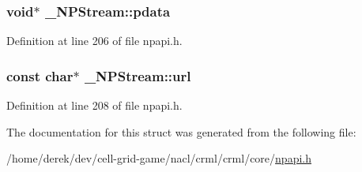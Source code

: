 \hypertarget{struct___n_p_stream_a140226c99a9260cc421166c426973d31}{
\subsubsection[{pdata}]{\setlength{\rightskip}{0pt plus 5cm}void$\ast$ {\bf \_\-NPStream::pdata}}}
\label{struct___n_p_stream_a140226c99a9260cc421166c426973d31}


Definition at line 206 of file npapi.h.

\hypertarget{struct___n_p_stream_a9a7484e81a72b591f97bb176536c5a83}{
\subsubsection[{url}]{\setlength{\rightskip}{0pt plus 5cm}const char$\ast$ {\bf \_\-NPStream::url}}}
\label{struct___n_p_stream_a9a7484e81a72b591f97bb176536c5a83}


Definition at line 208 of file npapi.h.



The documentation for this struct was generated from the following file:\begin{DoxyCompactItemize}
\item 
/home/derek/dev/cell-\/grid-\/game/nacl/crml/crml/core/\hyperlink{npapi_8h}{npapi.h}\end{DoxyCompactItemize}

